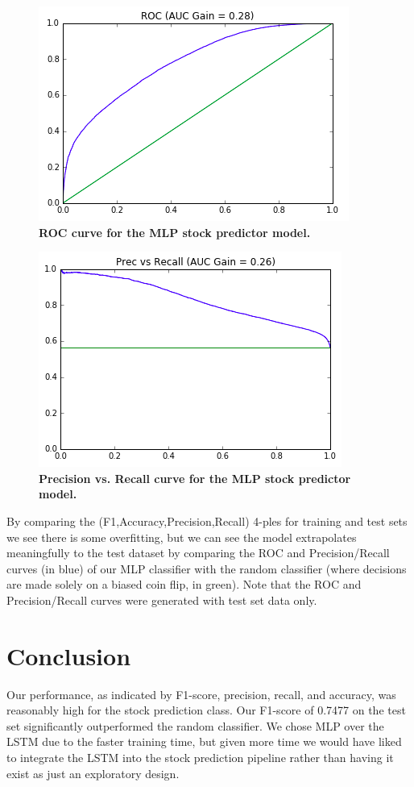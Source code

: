 \documentclass{sig-alternate-05-2015}
\begin{document}
\begin{figure}[H]
	\centering\includegraphics[scale=0.6]{mlp1} 
	\caption{\textbf{ROC curve for the MLP stock predictor model.}}
\end{figure}

\begin{figure}[H]
	\centering\includegraphics[scale=0.6]{mlp2} 
	\caption{\textbf{Precision vs. Recall curve for the MLP stock predictor model.}}
\end{figure}

	
By comparing the (F1,Accuracy,Precision,Recall) 4-ples for training and test sets we see there is some overfitting, but we can see the model extrapolates meaningfully to the test dataset by comparing the ROC and Precision/Recall curves (in blue) of our MLP classifier with the random classifier (where decisions are made solely on a biased coin flip, in green).  Note that the ROC and Precision/Recall curves were generated with test set data only.


\section{Conclusion}
Our performance, as indicated by F1-score, precision, recall, and accuracy, was reasonably high for the stock prediction class. Our F1-score of 0.7477 on the test set  significantly outperformed the random classifier. We chose MLP over the LSTM due to the faster training time, but given more time we would have liked to integrate the LSTM into the stock prediction pipeline rather than having it exist as just an exploratory design.
\end{document}
